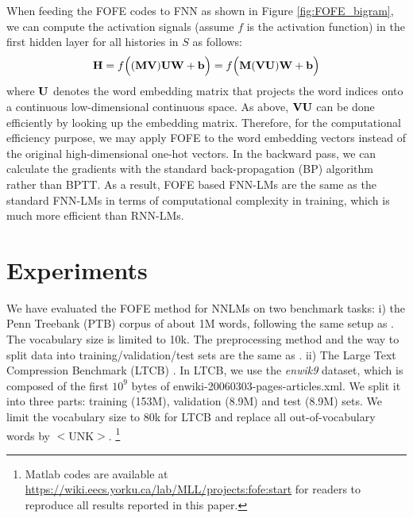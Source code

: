 \documentclass[11pt]{article}
\begin{document}
When feeding the FOFE codes to FNN as shown in Figure \ref{fig:FOFE_bigram}, we can compute the activation signals (assume $f$ is the activation function) in the first hidden layer for all histories in $S$  as follows: 
\begin{equation}
\label{eq.FOFE_forward}
{\bf H} = f\Big(({\bf M}  {\bf V}) {\bf U} {\bf W} + {\bf b}\Big) 
=  f\Big({\bf M} ({\bf V} {\bf U})  {\bf W} + {\bf b}\Big)  \nonumber
\end{equation}
where ${\bf U}$ denotes the word embedding matrix that projects the word indices onto a continuous low-dimensional continuous space. 
As above, ${\bf V} {\bf U}$ can be done efficiently by looking up the embedding matrix. Therefore, 
for the computational efficiency purpose, we may apply FOFE to the word embedding vectors  instead of the original high-dimensional one-hot vectors. In the backward pass, we can calculate the gradients with the standard back-propagation (BP) algorithm rather than BPTT. As a result, FOFE based FNN-LMs are the same as the standard FNN-LMs
in terms of computational complexity in training, which is much more efficient than RNN-LMs.

\section{Experiments}
\label{sec.Experiments}

We have evaluated the FOFE method for NNLMs on two benchmark tasks: i) the Penn Treebank (PTB) corpus of about 1M words, following the same setup as \cite{Mikolov2011Extension}.
The vocabulary size is limited to 10k. The preprocessing method and the way to split data into training/validation/test sets are the same as \cite{Mikolov2011Extension}. 
ii) The Large Text Compression Benchmark (LTCB) \cite{Mahoney2011}. In LTCB, we use the {\em enwik9} dataset, which is composed of  the first $10^9$ bytes of enwiki-20060303-pages-articles.xml. We  
split it into three parts:  training (153M), validation (8.9M) and test (8.9M) sets. 
We limit the vocabulary size to 80k for LTCB and replace all out-of-vocabulary words by $<$UNK$>$. \footnote{Matlab codes are available at \url{https://wiki.eecs.yorku.ca/lab/MLL/projects:fofe:start} for readers to reproduce all results reported in this paper.}   

\end{document}
